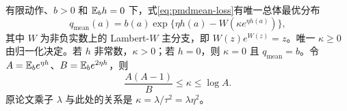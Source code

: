 \begin{theorem}
\label{thm:pmdmean-lambert}
有限动作、$b>0$ 和 $\mathbb{E}_bh=0$ 下，式\eqref{eq:pmdmean-loss}有唯一总体最优分布
\begin{equation}
 q_{\mathrm{mean}}(a)=b(a)\exp\{\eta h(a)-W(\kappa e^{\eta h(a)})\},
 \label{eq:pmdmean-lambert}
\end{equation}
其中 $W$ 为非负实数上的 Lambert-$W$ 主分支，即 $W(z)e^{W(z)}=z$。唯一 $\kappa\geq0$ 由归一化决定。若 $h$ 非常数，$\kappa>0$；若 $h=0$，则 $\kappa=0$ 且 $q_{\mathrm{mean}}=b$。令 $A=\mathbb{E}_be^{\eta h}$、$B=\mathbb{E}_be^{2\eta h}$，则
\begin{equation}
 \frac{A(A-1)}B\leq\kappa\leq\log A.
 \label{eq:pmdmean-kappa-bounds}
\end{equation}
原论文乘子 $\lambda$ 与此处的关系是 $\kappa=\lambda/\tau^2=\lambda\eta^2$。
\end{theorem}
